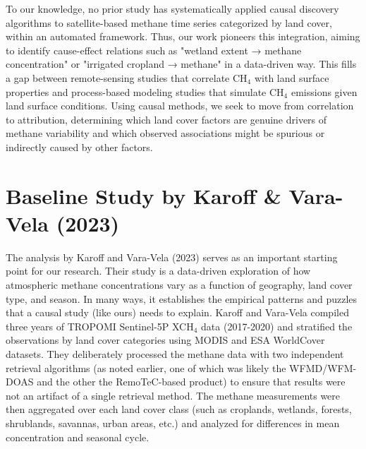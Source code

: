 To our knowledge, no prior study has systematically applied causal discovery algorithms to satellite-based methane time series categorized by land cover, within an automated framework. Thus, our work pioneers this integration, aiming to identify cause-effect relations such as "wetland extent → methane concentration" or "irrigated cropland → methane" in a data-driven way. This fills a gap between remote-sensing studies that correlate CH$_4$ with land surface properties and process-based modeling studies that simulate CH$_4$ emissions given land surface conditions. Using causal methods, we seek to move from correlation to attribution, determining which land cover factors are genuine drivers of methane variability and which observed associations might be spurious or indirectly caused by other factors.


\section{Baseline Study by Karoff \& Vara-Vela (2023)} 
\label{sec:baseline}

The analysis by Karoff and Vara-Vela (2023) \cite{Karoff2023} serves as an important starting point for our research. Their study is a data-driven exploration of how atmospheric methane concentrations vary as a function of geography, land cover type, and season. In many ways, it establishes the empirical patterns and puzzles that a causal study (like ours) needs to explain. Karoff and Vara-Vela compiled three years of TROPOMI Sentinel-5P XCH$_4$ data (2017-2020) and stratified the observations by land cover categories using MODIS and ESA WorldCover datasets. They deliberately processed the methane data with two independent retrieval algorithms (as noted earlier, one of which was likely the WFMD/WFM-DOAS and the other the RemoTeC-based product) to ensure that results were not an artifact of a single retrieval method. The methane measurements were then aggregated over each land cover class (such as croplands, wetlands, forests, shrublands, \gls{savannas}, urban areas, etc.) and analyzed for differences in mean concentration and seasonal cycle.


